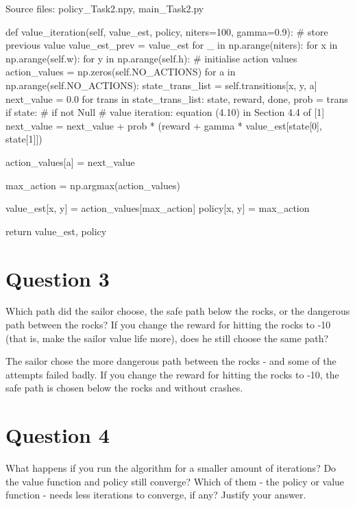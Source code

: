 \documentclass[12pt]{article}
\begin{document}
\noindent
Source files: policy\_Task2.npy, main\_Task2.py

\begin{pycode}
def value_iteration(self, value_est, policy, niters=100, gamma=0.9):
    # store previous value       
    value_est_prev = value_est
    for _ in np.arange(niters):
        for x in np.arange(self.w):
            for y in np.arange(self.h):
                # initialise action values
                action_values = np.zeros(self.NO_ACTIONS)
                for a in np.arange(self.NO_ACTIONS):
                    state_trans_list = self.transitions[x, y, a]
                    next_value = 0.0
                    for trans in state_trans_list:
                        state, reward, done, prob = trans
                        if state: # if not Null
                            # value iteration: equation (4.10) in Section 4.4 of [1]
                            next_value = next_value + prob * (reward + gamma * value_est[state[0], state[1]])

                    action_values[a] = next_value                                                

                max_action = np.argmax(action_values)
                
                value_est[x, y] = action_values[max_action]
                policy[x, y] = max_action

    return value_est, policy
\end{pycode}

\section*{Question 3}

Which path did the sailor choose, the safe path below the rocks, or the dangerous
path between the rocks? If you change the reward for hitting the rocks to -10 (that is, make the sailor value life more), does he still choose the same path?
\newline

The sailor chose the more dangerous path between the rocks - and some of the attempts failed badly. If you change the reward for hitting the rocks to -10, the safe path is chosen below the rocks and without crashes.
\pagebreak

\section*{Question 4}
What happens if you run the algorithm for a smaller amount of iterations?
Do the value function and policy still converge? Which of them - the policy or value function - needs less iterations to converge, if any? Justify your answer.
\newline
\end{document}
